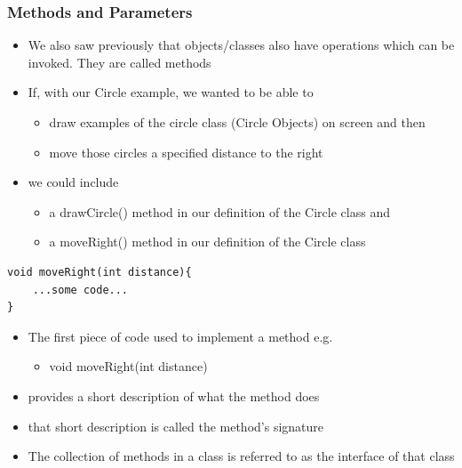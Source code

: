 \documentclass{beamer}
\begin{document}
\begin{frame}[fragile]
\frametitle{Methods and Parameters}
\begin{itemize}
\item We also saw previously that objects/classes also have operations which can be invoked. They are called \alert{methods}
\item If, with our Circle example, we wanted to be able to
\begin{itemize}
\item draw examples of the circle class (Circle Objects) on screen and then
\item move those circles a specified distance to the right
\end{itemize}
\item we could include
\begin{itemize}
\item a drawCircle() method in our definition of the Circle class and
\item a moveRight() method in our definition of the Circle class
\end{itemize}
\end{itemize}
\begin{block}{}
\begin{lstlisting}
void moveRight(int distance){
	...some code...
}
\end{lstlisting}
\end{block}
\end{frame}

\begin{frame}
\begin{itemize}
\item The first piece of code used to implement a method e.g.  
\begin{itemize}
\item void moveRight(int distance)
\end{itemize}
\item provides a short description of what the method does
\item that short description is called the method's \alert{signature}
\item The collection of methods in a class is referred to as the \alert{interface} of that class
\end{itemize}
\end{frame}
\end{document}
